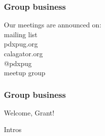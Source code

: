 \documentclass{beamer}
\begin{document}
\frame
{
  \frametitle{Group business}
  \begin{center}
{\large Our meetings are announced on:\\}
mailing list\\
pdxpug.org\\
calagator.org\\
@pdxpug\\
meetup group\\
\vspace{5mm}
  \end{center}
}

\frame
{
  \frametitle{Group business}
  \begin{center}
{\large Welcome, Grant!\\}
\vspace{5mm}
  \end{center}
}

\frame
{
  \begin{center}
{\huge Intros\\}
  \end{center}
}
\end{document}
